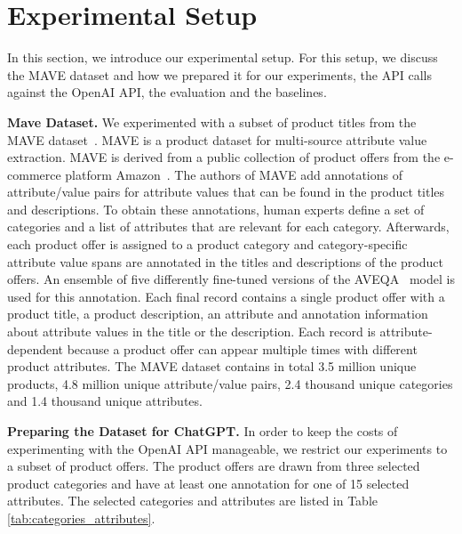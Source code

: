 \section{Experimental Setup}
\label{sec:experimental_setup}

In this section, we introduce our experimental setup. For this setup, we discuss the MAVE dataset and how we prepared it for our experiments, the API calls against the OpenAI API, the evaluation and the baselines.

\vspace{.2cm}\noindent\textbf{Mave Dataset.}
We experimented with a subset of product titles from the MAVE dataset~\cite{yang_mave_2022}. MAVE is a product dataset for multi-source attribute value extraction. MAVE is derived from a public collection of product offers from the e-commerce platform Amazon~\cite{ni_justifying_2019}. The authors of MAVE add annotations of attribute/value pairs for attribute values that can be found in the product titles and descriptions. To obtain these annotations, human experts define a set of categories and a list of attributes that are relevant for each category. Afterwards, each product offer is assigned to a product category and category-specific attribute value spans are annotated in the titles and descriptions of the product offers. An ensemble of five differently fine-tuned versions of the AVEQA~\cite{wang_learning_2020} model is used for this annotation. Each final record contains a single product offer with a product title, a product description, an attribute and annotation information about attribute values in the title or the description. Each record is attribute-dependent because a product offer can appear multiple times with different product attributes. The MAVE dataset contains in total 3.5 million unique products, 4.8 million unique attribute/value pairs, 2.4 thousand unique categories and 1.4 thousand unique attributes.

\vspace{.2cm}\noindent\textbf{Preparing the Dataset for ChatGPT.}
In order to keep the costs of experimenting with the OpenAI API manageable, we restrict our experiments to a subset of product offers.
The product offers are drawn from three selected product categories and have at least one annotation for one of 15 selected attributes. The selected categories and attributes are listed in Table \ref{tab:categories_attributes}.%

